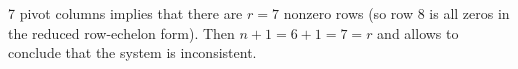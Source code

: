 7 pivot columns implies that there are $r=7$ nonzero rows (so row 8 is all zeros in the reduced row-echelon form).  Then $n+1=6+1=7=r$ and  allows to conclude that the system is inconsistent.
